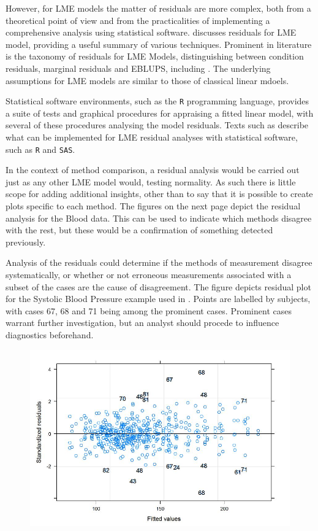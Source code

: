 \documentclass[12pt, a4paper]{report}
\theoremstyle{plain}
\theoremstyle{definition}
\theoremstyle{remark}
\begin{document}
However, for LME models the matter of residuals are more complex, both from a theoretical point of view and from the practicalities of implementing a comprehensive analysis using statistical software. \citet{schabenberger} discusses residuals for LME model, providing a useful summary of various techniques. Prominent in literature is the taxonomy of residuals for LME Models, distinguishing between condition residuals, marginal residuals and EBLUPS, including \citet{ HildenMinton, schabenberger, west, NobreSinger2007}. The underlying assumptions for LME models are similar to those of classical linear mdoels. 

Statistical software environments, such as the \texttt{R} programming language, provides a suite of tests and graphical procedures for appraising a fitted linear model, with several of these procedures analysing the model residuals. Texts such as \citet{PB,west,Galecki} describe what can be implemented for LME residual analyses with statistical software, such as \texttt{R} and \texttt{SAS}.

In the context of method comparison, a residual analysis would be carried out just as any other LME model would, testing normality. As such there is little scope for adding additional insights, other than to say that it is possible to create plots specific to each method. The figures on the next page depict the residual analysis for the Blood data. This can be used to indicate which methods disagree with the rest, but these would be a confirmation of something detected previously.

Analysis of the residuals could determine if the methods of measurement disagree systematically, or whether or not erroneous measurements associated with a subset of the cases are the cause of disagreement. 
The figure depicts residual plot for the Systolic Blood Pressure example used in \citet{BA99}. Points are labelled by subjects, with cases 67, 68 and 71 being among the prominent cases. Prominent cases warrant further investigation, but an analyst should procede to influence diagnostics beforehand.

\begin{figure}[h!]
			\centering
			\includegraphics[width=0.8\linewidth]{images/Residuals-JS-Roy}
		\end{figure}
		
\end{document}
